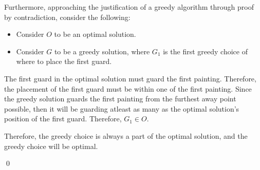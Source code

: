 \documentclass{report}
\begin{document}
\begin{enumerate}
\begin{enumerate}
      Furthermore, approaching the justification of a greedy algorithm through proof by contradiction, consider the following:
      \begin{itemize}
        \item Consider $O$ to be an optimal solution.
        \item Consider $G$ to be a greedy solution, where $G_1$ is the first greedy choice of where to place the first guard.
      \end{itemize}
      The first guard in the optimal solution must guard the first painting. Therefore, the placement of the first guard must be within one of the first painting. Since the greedy solution guards the first painting from the furthest away point possible, then it will be guarding atleast as many as the optimal solution's position of the first guard. Therefore, $G_1 \in O$.

      Therefore, the greedy choice is always a part of the optimal solution, and the greedy choice will be optimal. \\

    \end{enumerate}

  \end{enumerate}

  \qed
\end{document}
